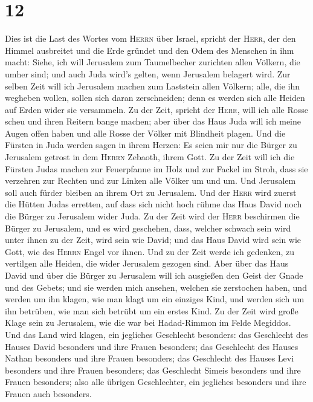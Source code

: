 \hypertarget{section-11}{%
\section{12}\label{section-11}}

 Dies ist die Last des Wortes vom \textsc{Herrn} über
Israel, spricht der \textsc{Herr}, der den Himmel ausbreitet und die
Erde gründet und den Odem des Menschen in ihm macht: 
Siehe, ich will Jerusalem zum Taumelbecher zurichten allen Völkern, die
umher sind; und auch Juda wird's gelten, wenn Jerusalem belagert wird.
 Zur selben Zeit will ich Jerusalem machen zum Laststein
allen Völkern; alle, die ihn wegheben wollen, sollen sich daran
zerschneiden; denn es werden sich alle Heiden auf Erden wider sie
versammeln.  Zu der Zeit, spricht der \textsc{Herr}, will
ich alle Rosse scheu und ihren Reitern bange machen; aber über das Haus
Juda will ich meine Augen offen haben und alle Rosse der Völker mit
Blindheit plagen.  Und die Fürsten in Juda werden sagen in
ihrem Herzen: Es seien mir nur die Bürger zu Jerusalem getrost in dem
\textsc{Herrn} Zebaoth, ihrem Gott.  Zu der Zeit will ich
die Fürsten Judas machen zur Feuerpfanne im Holz und zur Fackel im
Stroh, dass sie verzehren zur Rechten und zur Linken alle Völker um und
um. Und Jerusalem soll auch fürder bleiben an ihrem Ort zu Jerusalem.
 Und der \textsc{Herr} wird zuerst die Hütten Judas
erretten, auf dass sich nicht hoch rühme das Haus David noch die Bürger
zu Jerusalem wider Juda.  Zu der Zeit wird der
\textsc{Herr} beschirmen die Bürger zu Jerusalem, und es wird geschehen,
dass, welcher schwach sein wird unter ihnen zu der Zeit, wird sein wie
David; und das Haus David wird sein wie Gott, wie des \textsc{Herrn}
Engel vor ihnen.  Und zu der Zeit werde ich gedenken, zu
vertilgen alle Heiden, die wider Jerusalem gezogen sind. 
Aber über das Haus David und über die Bürger zu Jerusalem will ich
ausgießen den Geist der Gnade und des Gebets; und sie werden mich
ansehen, welchen sie zerstochen haben, und werden um ihn klagen, wie man
klagt um ein einziges Kind, und werden sich um ihn betrüben, wie man
sich betrübt um ein erstes Kind.  Zu der Zeit wird große
Klage sein zu Jerusalem, wie die war bei Hadad-Rimmon im Felde Megiddos.
 Und das Land wird klagen, ein jegliches Geschlecht
besonders: das Geschlecht des Hauses David besonders und ihre Frauen
besonders; das Geschlecht des Hauses Nathan besonders und ihre Frauen
besonders;  das Geschlecht des Hauses Levi besonders und
ihre Frauen besonders; das Geschlecht Simeis besonders und ihre Frauen
besonders;  also alle übrigen Geschlechter, ein jegliches
besonders und ihre Frauen auch besonders.

